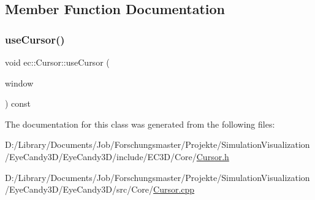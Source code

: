 \subsection{Member Function Documentation}
\mbox{\label{classec_1_1_cursor_ad99efc837c8f7fb348d2ea7c3bd230d4}} 
\subsubsection{\texorpdfstring{use\+Cursor()}{useCursor()}}
{\footnotesize\ttfamily void ec\+::\+Cursor\+::use\+Cursor (\begin{DoxyParamCaption}\item[{G\+L\+F\+Wwindow $\ast$}]{window }\end{DoxyParamCaption}) const}



The documentation for this class was generated from the following files\+:\begin{DoxyCompactItemize}
\item 
D\+:/\+Library/\+Documents/\+Job/\+Forschungsmaster/\+Projekte/\+Simulation\+Visualization/\+Eye\+Candy3\+D/\+Eye\+Candy3\+D/include/\+E\+C3\+D/\+Core/\mbox{\hyperlink{_cursor_8h}{Cursor.\+h}}\item 
D\+:/\+Library/\+Documents/\+Job/\+Forschungsmaster/\+Projekte/\+Simulation\+Visualization/\+Eye\+Candy3\+D/\+Eye\+Candy3\+D/src/\+Core/\mbox{\hyperlink{_cursor_8cpp}{Cursor.\+cpp}}\end{DoxyCompactItemize}
